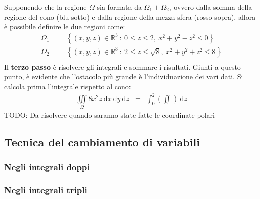 \documentclass[a4paper]{article}
\begin{document}
	\noindent
	Supponendo che la regione $\Omega$ sia formata da $\Omega_{1} + \Omega_{2}$, ovvero dalla somma della regione del cono (blu sotto) e dalla regione della mezza sfera (rosso sopra), allora è possibile definire le due regioni come:
	\begin{equation*}
		\begin{array}{rcl}
			\Omega_{1} &=& \left\{\left(x,y,z\right) \in \mathbb{R}^{3} \: : \: 0 \le z \le 2, \: x^{2} + y^{2} - z^{2} \le 0\right\} \\ [.5em]
			\Omega_{2} &=& \left\{\left(x,y,z\right) \in \mathbb{R}^{3} \: : \: 2 \le z \le \sqrt{8}, \: x^{2} + y^{2} + z^{2} \le 8\right\} \\ [.5em]
		\end{array}
	\end{equation*}
	Il \textbf{terzo passo} è risolvere gli integrali e sommare i risultati. Giunti a questo punto, è evidente che l'ostacolo più grande è l'individuazione dei vari dati. Si calcola prima l'integrale rispetto al cono:
	\begin{equation*}
		\begin{array}{rcl}
			\displaystyle\iiint\limits_{\Omega} 8x^{2}z \:\mathrm{d}x\:\mathrm{d}y\:\mathrm{d}z &=& \displaystyle\int_{0}^{2} \left(\iint\right) \:\mathrm{d}z
		\end{array}
	\end{equation*}
	TODO: Da risolvere quando saranno state fatte le coordinate polari

	\newpage

	\subsection{Tecnica del cambiamento di variabili}

	\newpage

	\subsubsection{Negli integrali doppi}

	\newpage

	\subsubsection{Negli integrali tripli}



\end{document}
